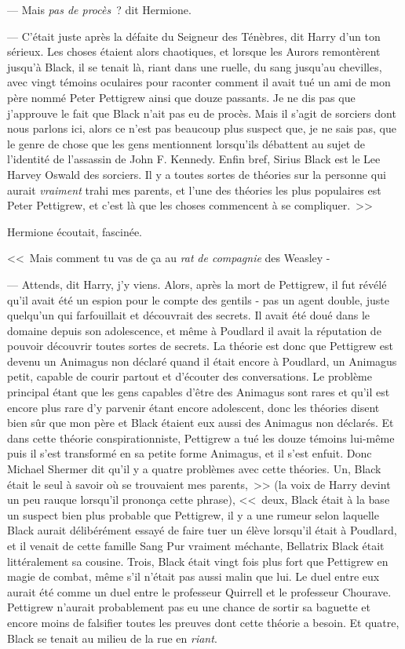 --- Mais \emph{pas de procès}~? dit Hermione.

--- C'était juste après la défaite du Seigneur des Ténèbres, dit Harry d'un ton sérieux. Les choses étaient alors chaotiques, et lorsque les Aurors remontèrent jusqu'à Black, il se tenait là, riant dans une ruelle, du sang jusqu'au chevilles, avec vingt témoins oculaires pour raconter comment il avait tué un ami de mon père nommé Peter Pettigrew ainsi que douze passants. Je ne dis pas que j'approuve le fait que Black n'ait pas eu de procès. Mais il s'agit de sorciers dont nous parlons ici, alors ce n'est pas beaucoup plus suspect que, je ne sais pas, que le genre de chose que les gens mentionnent lorsqu'ils débattent au sujet de l'identité de l'assassin de John F. Kennedy. Enfin bref, Sirius Black est le Lee Harvey Oswald des sorciers. Il y a toutes sortes de théories sur la personne qui aurait \emph{vraiment} trahi mes parents, et l'une des théories les plus populaires est Peter Pettigrew, et c'est là que les choses commencent à se compliquer.~>>

Hermione écoutait, fascinée.

<<~Mais comment tu vas de ça au \emph{rat} \emph{de compagnie} des Weasley -

--- Attends, dit Harry, j'y viens. Alors, après la mort de Pettigrew, il fut révélé qu'il avait été un espion pour le compte des gentils - pas un agent double, juste quelqu'un qui farfouillait et découvrait des secrets. Il avait été doué dans le domaine depuis son adolescence, et même à Poudlard il avait la réputation de pouvoir découvrir toutes sortes de secrets. La théorie est donc que Pettigrew est devenu un Animagus non déclaré quand il était encore à Poudlard, un Animagus petit, capable de courir partout et d'écouter des conversations. Le problème principal étant que les gens capables d'être des Animagus sont rares et qu'il est encore plus rare d'y parvenir étant encore adolescent, donc les théories disent bien sûr que mon père et Black étaient eux aussi des Animagus non déclarés. Et dans cette théorie conspirationniste, Pettigrew a tué les douze témoins lui-même puis il s'est transformé en sa petite forme Animagus, et il s'est enfuit. Donc Michael Shermer dit qu'il y a quatre problèmes avec cette théories. Un, Black était le seul à savoir où se trouvaient mes parents,~>> (la voix de Harry devint un peu rauque lorsqu'il prononça cette phrase), <<~deux, Black était à la base un suspect bien plus probable que Pettigrew, il y a une rumeur selon laquelle Black aurait délibérément essayé de faire tuer un élève lorsqu'il était à Poudlard, et il venait de cette famille Sang Pur vraiment méchante, Bellatrix Black était littéralement sa cousine. Trois, Black était vingt fois plus fort que Pettigrew en magie de combat, même s'il n'était pas aussi malin que lui. Le duel entre eux aurait été comme un duel entre le professeur Quirrell et le professeur Chourave. Pettigrew n'aurait probablement pas eu une chance de sortir sa baguette et encore moins de falsifier toutes les preuves dont cette théorie a besoin. Et quatre, Black se tenait au milieu de la rue en \emph{riant}.

